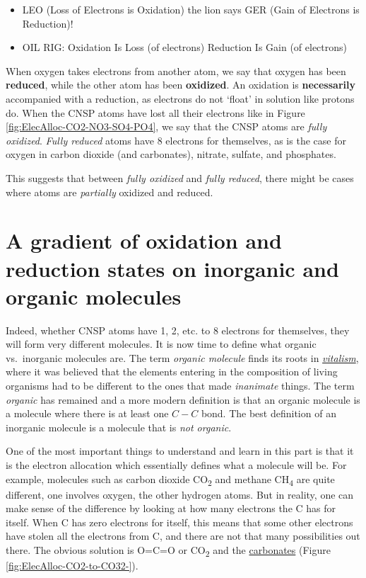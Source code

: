 \documentclass[]{book}
\providecommand{\tightlist}{%
  \setlength{\itemsep}{0pt}\setlength{\parskip}{0pt}}
\theoremstyle{definition}
\theoremstyle{definition}
\theoremstyle{definition}
\theoremstyle{remark}
\begin{document}
\begin{itemize}
\tightlist
\item
  LEO (Loss of Electrons is Oxidation) the lion says GER (Gain of
  Electrons is Reduction)!
\item
  OIL RIG: Oxidation Is Loss (of electrons) Reduction Is Gain (of
  electrons)
\end{itemize}

When oxygen takes electrons from another atom, we say that oxygen has
been \textbf{reduced}, while the other atom has been \textbf{oxidized}.
An oxidation is \textbf{necessarily} accompanied with a reduction, as
electrons do not `float' in solution like protons do. When the CNSP
atoms have lost all their electrons like in Figure
\ref{fig:ElecAlloc-CO2-NO3-SO4-PO4}, we say that the CNSP atoms are
\emph{fully oxidized}. \emph{Fully reduced} atoms have 8 electrons for
themselves, as is the case for oxygen in carbon dioxide (and
carbonates), nitrate, sulfate, and phosphates.

This suggests that between \emph{fully oxidized} and \emph{fully
reduced}, there might be cases where atoms are \emph{partially} oxidized
and reduced.

\section{A gradient of oxidation and reduction states on inorganic and
organic
molecules}\label{a-gradient-of-oxidation-and-reduction-states-on-inorganic-and-organic-molecules}

Indeed, whether CNSP atoms have 1, 2, etc. to 8 electrons for
themselves, they will form very different molecules. It is now time to
define what organic vs.~inorganic molecules are. The term \emph{organic
molecule} finds its roots in
\emph{\href{https://en.wikipedia.org/wiki/Vitalism}{vitalism}}, where it
was believed that the elements entering in the composition of living
organisms had to be different to the ones that made \emph{inanimate}
things. The term \emph{organic} has remained and a more modern
definition is that an organic molecule is a molecule where there is at
least one \(C-C\) bond. The best definition of an inorganic molecule is
a molecule that is \emph{not organic}.

One of the most important things to understand and learn in this part is
that it is the electron allocation which essentially defines what a
molecule will be. For example, molecules such as carbon dioxide
CO\textsubscript{2} and methane CH\textsubscript{4} are quite different,
one involves oxygen, the other hydrogen atoms. But in reality, one can
make sense of the difference by looking at how many electrons the C has
for itself. When C has zero electrons for itself, this means that some
other electrons have stolen all the electrons from C, and there are not
that many possibilities out there. The obvious solution is O=C=O or
CO\textsubscript{2} and the \protect\hyperlink{carbonates}{carbonates}
(Figure \ref{fig:ElecAlloc-CO2-to-CO32-}).
\end{document}
